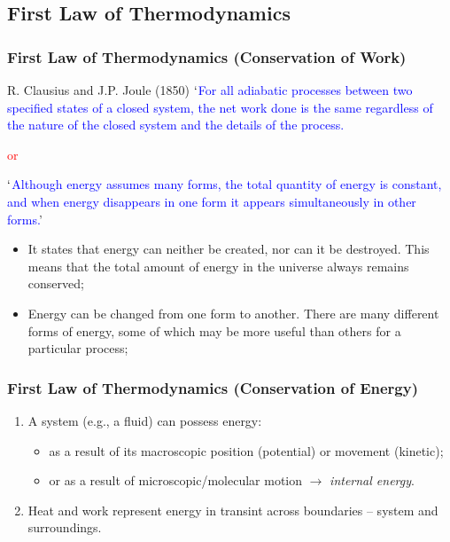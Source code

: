 \documentclass[10pt,compress,handout,ignorenonframetext]{beamer}
\begin{document}
\subsection{First Law of Thermodynamics}

\begin{frame}
 \frametitle{First Law of Thermodynamics (Conservation of Work)}

 \begin{block}{R. Clausius and J.P. Joule (1850)}
  \textcolor{blue}{$\lq$For all adiabatic processes between two specified states of a closed system, the net work done is the same regardless of the nature of the closed system and the details of the process.}
  \begin{center}
   \textcolor{red}{or}
  \end{center}
  \textcolor{blue}{$\lq$Although energy assumes many forms, the total quantity of energy is constant, and when energy disappears in one form it appears simultaneously in other forms.}'
 \end{block}


 \begin{itemize}
  \item<2-> It states that energy can neither be created, nor can it be destroyed. This means that the total amount of energy in the universe always remains conserved;
  \item<3-> Energy can be changed from one form to another. There are many different forms of energy, some of which may be more useful than others for a particular process;
 \end{itemize}

\normalsize
\end{frame}

\begin{frame}
 \frametitle{First Law of Thermodynamics (Conservation of Energy)}
   \begin{enumerate}
      \item<1-> A system (e.g., a fluid) can possess energy:
        \begin{itemize}
          \item<1-> as a result of its macroscopic position (potential) or movement (kinetic);
          \item<1-> or as a result of microscopic/molecular motion $\rightarrow$ {\it internal energy}.
        \end{itemize}

      \item<3-> Heat and work represent energy in transint across boundaries -- system and surroundings.

   \end{enumerate}
\normalsize
\end{frame}
\end{document}
